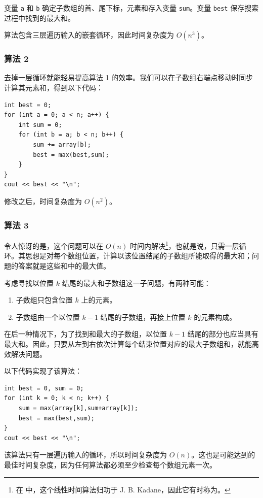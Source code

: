 变量 \texttt{a} 和 \texttt{b} 确定子数组的首、尾下标，元素和存入变量 \texttt{sum}。变量 \texttt{best} 保存搜索过程中找到的最大和。

算法包含三层遍历输入的嵌套循环，因此时间复杂度为 $O(n^3)$。

\subsubsection{算法 2}

去掉一层循环就能轻易提高算法 1 的效率。我们可以在子数组右端点移动时同步计算其元素和，得到以下代码：

\begin{lstlisting}
int best = 0;
for (int a = 0; a < n; a++) {
    int sum = 0;
    for (int b = a; b < n; b++) {
        sum += array[b];
        best = max(best,sum);
    }
}
cout << best << "\n";
\end{lstlisting}
修改之后，时间复杂度为 $O(n^2)$。

\subsubsection{算法 3}

令人惊讶的是，这个问题可以在 $O(n)$ 时间内解决\footnote{在 \cite{ben86} 中，这个线性时间算法归功于 J. B. Kadane，因此它有时称为。}，也就是说，只需一层循环。其思想是对每个数组位置，计算以该位置结尾的子数组所能取得的最大和；问题的答案就是这些和中的最大值。

考虑寻找以位置 $k$ 结尾的最大和子数组这一子问题，有两种可能：
\begin{enumerate}
\item 子数组只包含位置 $k$ 上的元素。
\item 子数组由一个以位置 $k-1$ 结尾的子数组，再接上位置 $k$ 的元素构成。
\end{enumerate}

在后一种情况下，为了找到和最大的子数组，以位置 $k-1$ 结尾的部分也应当具有最大和。因此，只要从左到右依次计算每个结束位置对应的最大子数组和，就能高效解决问题。

以下代码实现了该算法：
\begin{lstlisting}
int best = 0, sum = 0;
for (int k = 0; k < n; k++) {
    sum = max(array[k],sum+array[k]);
    best = max(best,sum);
}
cout << best << "\n";
\end{lstlisting}

该算法只有一层遍历输入的循环，所以时间复杂度为 $O(n)$。这也是可能达到的最佳时间复杂度，因为任何算法都必须至少检查每个数组元素一次。

